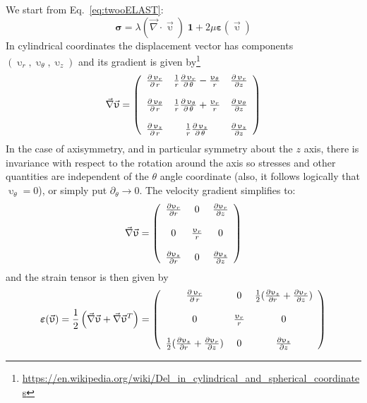 We start from Eq.~\eqref{eq:twooELAST}:
\begin{equation}
{\bm \sigma} = 
\lambda (\vec\nabla\cdot\vec{\upupsilon}) \;  {\bm 1}
+2 \mu {\bm \varepsilon}(\vec{\upupsilon})
\label{eq:elast_as}
\end{equation}
In cylindrical coordinates the displacement vector has components 
$(\upupsilon_r,\upupsilon_\theta,\upupsilon_z)$ and its gradient is given 
by\footnote{\url{https://en.wikipedia.org/wiki/Del_in_cylindrical_and_spherical_coordinates}}
\[
\vec\nabla \vec{\upupsilon}  =
\left(
\begin{array}{ccc}
{\partial \, \upupsilon_r \over \partial \, r} &
{1 \over r} {\partial \, \upupsilon_r \over \partial \, \theta} - {\upupsilon_{\theta} \over r} &
{\partial \, \upupsilon_r \over \partial z} \\
\\
{\partial \, \upupsilon_{\theta} \over \partial \, r} &
{1 \over r} {\partial \, \upupsilon_{\theta} \over \partial \, \theta} + {\upupsilon_r \over r} &
{\partial \, \upupsilon_{\theta} \over \partial z} \\
\\
{\partial \, \upupsilon_{z} \over \partial \, r} &
{1 \over r} {\partial \, \upupsilon_{z} \over \partial \, \theta} &
{\partial \, \upupsilon_{z} \over \partial z}
\end{array}
\right)
\]
In the case of axisymmetry, and in particular symmetry about the $z$ axis, 
there is invariance with respect to the rotation around the axis so stresses 
and other quantities are independent of the $\theta$ angle coordinate 
(also, it follows logically that $\upupsilon_\theta=0$), 
or simply put $\partial_\theta \rightarrow 0$. 
The velocity gradient simplifies to:
\[
\vec\nabla \vec{\upupsilon}  =
\left(
\begin{array}{ccc}
\frac{\partial \upupsilon_r}{\partial r} & 0 & 
{\partial  \upupsilon_r \over \partial z} \\\\
0 & {\upupsilon_r \over r} & 0 \\ \\
{\partial \upupsilon_{z} \over \partial  r} & 0 & 
{\partial  \upupsilon_{z} \over \partial z}
\end{array}
\right)
\]
and the strain tensor is then given by 
\begin{equation}
\label{eq:strain_as} 
{\bm \varepsilon}(\vec{\upupsilon})
=\frac12\left(\vec\nabla \vec{\upupsilon}+
\vec\nabla \vec{\upupsilon}^T\right)
=
\left(
\begin{array}{ccc}
{\partial \, \upupsilon_r \over \partial \, r} &
0 &
\frac12({\partial \upupsilon_{z} \over \partial r} 
+ {\partial \upupsilon_r \over \partial z}) \\ \\
0 & {\upupsilon_r \over r} & 0 \\ \\
\frac12({\partial \upupsilon_{z} \over \partial r} + 
{\partial \upupsilon_r \over \partial z} ) & 0 & 
{\partial \upupsilon_{z} \over \partial z} 
\end{array}
\right)
\end{equation}
